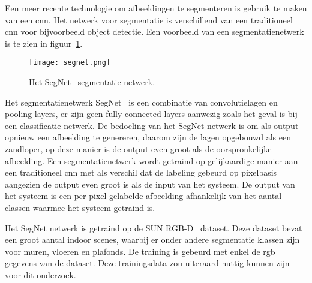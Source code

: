         Een meer recente technologie om afbeeldingen te segmenteren is gebruik te maken van een \gls{cnn}. Het netwerk voor segmentatie is verschillend van een traditioneel \gls{cnn} voor bijvoorbeeld object detectie.
        Een voorbeeld van een segmentatienetwerk is te zien in figuur~\ref{fig:segnet_cnn}.

        \begin{figure}[!hb]
            \centering
            \texttt{[image: segnet.png]}
            \caption{Het SegNet~\cite{Badrinarayanan} segmentatie netwerk.}
            \label{fig:segnet_cnn}
        \end{figure}

        Het segmentatienetwerk SegNet~\cite{Badrinarayanan} is een combinatie van convolutielagen en pooling layers, er zijn geen fully connected layers aanwezig zoals het geval is bij een classificatie netwerk.
        De bedoeling van het SegNet netwerk is om als output opnieuw een afbeelding te genereren, daarom zijn de lagen opgebouwd als een zandloper, op deze manier is de output even groot als de oorspronkelijke afbeelding.
        Een segmentatienetwerk wordt getraind op gelijkaardige manier aan een traditioneel \gls{cnn} met als verschil dat de labeling gebeurd op pixelbasis aangezien de output even groot is als de input van het systeem.
        De output van het systeem is een per pixel gelabelde afbeelding afhankelijk van het aantal classen waarmee het systeem getraind is.

        Het SegNet netwerk is getraind op de SUN RGB-D~\cite{Song_2015_CVPR} dataset. Deze dataset bevat een groot aantal indoor scenes, waarbij er onder andere segmentatie klassen zijn voor muren, vloeren en plafonds.
        De training is gebeurd met enkel de \gls{rgb} gegevens van de dataset. Deze trainingsdata zou uiteraard nuttig kunnen zijn voor dit onderzoek.

